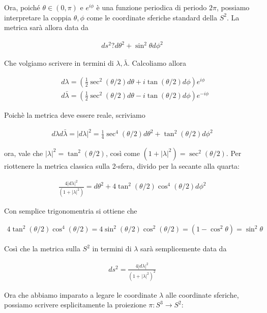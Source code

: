 \documentclass{report}
\begin{document}
Ora, poiché \(\theta \in (0, \pi)\) e \(e^{i\phi}\) è una funzione periodica di periodo \(2\pi\), possiamo interpretare la coppia \(\theta, \phi\) come le coordinate sferiche standard della \(S^2\). La metrica sarà allora data da 

\begin{align}
    ds^2 ? d\theta^2  + \sin^2\theta d\phi^2 
\end{align}

Che volgiamo scrivere in termini di \(\lambda, \bar{\lambda}\). Calcoliamo allora 

\begin{align}
    &d\lambda = \left(\frac{1}{2}\sec^2(\theta/2)d\theta + i\tan (\theta/2)d\phi \right)e^{i\phi} \\
    &d\bar{\lambda} = \left(\frac{1}{2}\sec^2(\theta/2)d\theta - i\tan (\theta/2)d\phi \right)e^{-i\phi}
\end{align}

Poichè la metrica deve essere reale, scriviamo 

\begin{align}
    d\lambda d\bar{\lambda} = |d\lambda|^2 = \frac{1}{4}\sec^4 (\theta/2)d\theta^2 + \tan^2(\theta/2)d\phi^2
\end{align}

ora, vale che \(|\lambda|^2 = \tan^2(\theta/2)\), così come \((1+|\lambda|^2) = \sec^2(\theta/2)\). Per riottenere la metrica classica sulla 2-sfera, divido per la secante alla quarta: 

\begin{align}
    \frac{4|d\lambda|^2}{(1+|\lambda|^2)} = d\theta^2 + 4\tan^2(\theta/2)\cos^4(\theta/2)d\phi^2
\end{align}

Con semplice trigonomentria si ottiene che 

\begin{align}
    4\tan^2(\theta/2)\cos^4(\theta/2) = 4\sin^2(\theta/2)\cos^2(\theta/2) = (1-\cos^2\theta) = \sin^2\theta
\end{align}

Così che la metrica sulla \(S^2\) in termini di \(\lambda\) sarà semplicemente data da

\begin{align}
    ds^2 = \frac{4|d\lambda|^2}{(1+|\lambda|^2)^2}
\end{align}

Ora che abbiamo imparato a legare le coordinate \(\lambda\) alle coordinate sferiche, possiamo scrivere esplicitamente la proiezione \(\pi: S^3 \rightarrow S^2\): 
\end{document}
